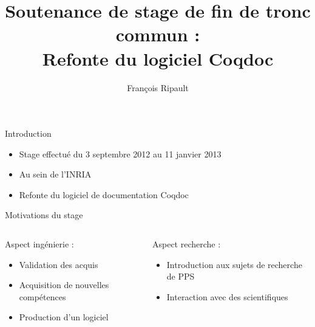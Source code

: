 \documentclass[compress]{beamer}
\title{Soutenance de stage de fin de tronc commun : \\ Refonte du logiciel Coqdoc}
\author{François Ripault}
\begin{document}
\begin{frame}
  \titlepage
\end{frame}

\begin{frame}{Introduction}
  \begin{itemize}
    \item Stage effectué du 3 septembre 2012 au 11 janvier 2013
    \item Au sein de l'INRIA
    \item Refonte du logiciel de documentation Coqdoc
  \end{itemize}
\end{frame}
  \begin{frame}{Motivations du stage}
  \begin{columns}[2]
    \begin{column}{0.5\textwidth}
    Aspect ingénierie :
  \begin{itemize}
    \item Validation des acquis
    \item Acquisition de nouvelles compétences
    \item Production d'un logiciel
  \end{itemize}
    \end{column}
    \begin{column}{0.5\textwidth}
      Aspect recherche :
  \begin{itemize}
    \item Introduction aux sujets de recherche
      de PPS
    \item Interaction avec des scientifiques
  \end{itemize}
    \end{column}
  \end{columns}
\end{frame}

\begin{frame}
\tableofcontents
\end{frame}
\end{document}
